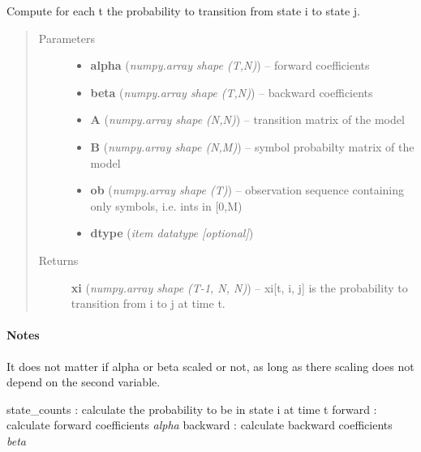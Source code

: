 \documentclass[letterpaper,10pt,english]{sphinxmanual}
\begin{document}

\begin{fulllineitems}
\label{hmm:kernel.python.transition_probabilities}
Compute for each t the probability to transition from state i to state j.
\begin{quote}\begin{description}
\item[{Parameters}] \leavevmode\begin{itemize}
\item {} 
\textbf{alpha} (\emph{numpy.array shape (T,N)}) --
forward coefficients

\item {} 
\textbf{beta} (\emph{numpy.array shape (T,N)}) --
backward coefficients

\item {} 
\textbf{A} (\emph{numpy.array shape (N,N)}) --
transition matrix of the model

\item {} 
\textbf{B} (\emph{numpy.array shape (N,M)}) --
symbol probabilty matrix of the model

\item {} 
\textbf{ob} (\emph{numpy.array shape (T)}) --
observation sequence containing only symbols, i.e. ints in {[}0,M)

\item {} 
\textbf{dtype} (\emph{item datatype {[}optional{]}})

\end{itemize}

\item[{Returns}] \leavevmode
\textbf{xi} (\emph{numpy.array shape (T-1, N, N)}) --
xi{[}t, i, j{]} is the probability to transition from i to j at time t.

\end{description}\end{quote}
\paragraph{Notes}

It does not matter if alpha or beta scaled or not, as long as there scaling
does not depend on the second variable.




state\_counts : calculate the probability to be in state i at time t
forward : calculate forward coefficients \emph{alpha}
backward : calculate backward coefficients \emph{beta}



\end{fulllineitems}
\end{document}
